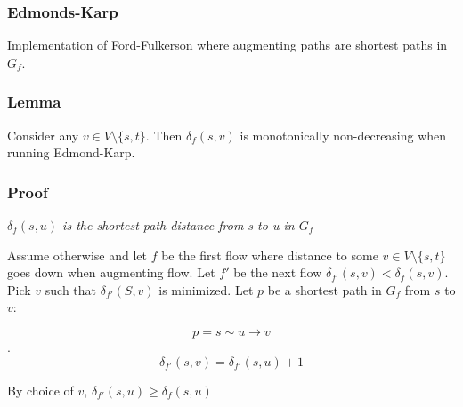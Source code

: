 \documentclass[12pt]{article}
\begin{document}
\subsubsection*{Edmonds-Karp}

Implementation of Ford-Fulkerson where augmenting paths are shortest paths in $G_f$.

\subsubsection*{\color{blue}Lemma}

Consider any $v \in V \setminus \{s, t\}$. Then $\delta_f(s,v)$ is monotonically non-decreasing when running Edmond-Karp.

\subsubsection*{\color{red}Proof}

\textit{$\delta_f(s,u)$ is the shortest path distance from s to u in $G_f$}

Assume otherwise and let $f$ be the first flow where distance to some $v \in V \setminus \{s,t\}$ goes down when augmenting flow. Let $f'$ be the next flow $\delta_{f'}(s,v) < \delta_f(s,v)$. Pick $v$ such that $\delta_{f'}(S,v)$ is minimized. Let $p$ be a shortest path in $G_f$ from $s$ to $v$:

$$p = s \sim u \rightarrow v$$.
$$\delta_{f'}(s,v) = \delta_{f'}(s,u) + 1$$

By choice of $v$, $\delta_{f'}(s,u) \geq \delta_f(s,u)$
\end{document}
